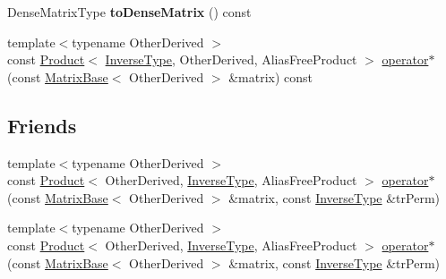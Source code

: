 \begin{DoxyCompactItemize}
\item 
\mbox{\label{class_eigen_1_1_inverse_impl_3_01_permutation_type_00_01_permutation_storage_01_4_a17d9216ffff2de32c56b6ff82a3c2a9d}} 
Dense\+Matrix\+Type {\bfseries to\+Dense\+Matrix} () const
\item 
{\footnotesize template$<$typename Other\+Derived $>$ }\\const \hyperlink{group___core___module_class_eigen_1_1_product}{Product}$<$ \hyperlink{class_eigen_1_1_inverse}{Inverse\+Type}, Other\+Derived, Alias\+Free\+Product $>$ \hyperlink{class_eigen_1_1_inverse_impl_3_01_permutation_type_00_01_permutation_storage_01_4_abf863c3bf5bde58cead077f335bfff3a}{operator$\ast$} (const \hyperlink{group___core___module_class_eigen_1_1_matrix_base}{Matrix\+Base}$<$ Other\+Derived $>$ \&matrix) const
\end{DoxyCompactItemize}
\subsection*{Friends}
\begin{DoxyCompactItemize}
\item 
{\footnotesize template$<$typename Other\+Derived $>$ }\\const \hyperlink{group___core___module_class_eigen_1_1_product}{Product}$<$ Other\+Derived, \hyperlink{class_eigen_1_1_inverse}{Inverse\+Type}, Alias\+Free\+Product $>$ \hyperlink{class_eigen_1_1_inverse_impl_3_01_permutation_type_00_01_permutation_storage_01_4_a1d5a5cf25a5052d1b8181587375c853b}{operator$\ast$} (const \hyperlink{group___core___module_class_eigen_1_1_matrix_base}{Matrix\+Base}$<$ Other\+Derived $>$ \&matrix, const \hyperlink{class_eigen_1_1_inverse}{Inverse\+Type} \&tr\+Perm)
\item 
{\footnotesize template$<$typename Other\+Derived $>$ }\\const \hyperlink{group___core___module_class_eigen_1_1_product}{Product}$<$ Other\+Derived, \hyperlink{class_eigen_1_1_inverse}{Inverse\+Type}, Alias\+Free\+Product $>$ \hyperlink{class_eigen_1_1_inverse_impl_3_01_permutation_type_00_01_permutation_storage_01_4_a1d5a5cf25a5052d1b8181587375c853b}{operator$\ast$} (const \hyperlink{group___core___module_class_eigen_1_1_matrix_base}{Matrix\+Base}$<$ Other\+Derived $>$ \&matrix, const \hyperlink{class_eigen_1_1_inverse}{Inverse\+Type} \&tr\+Perm)
\end{DoxyCompactItemize}


